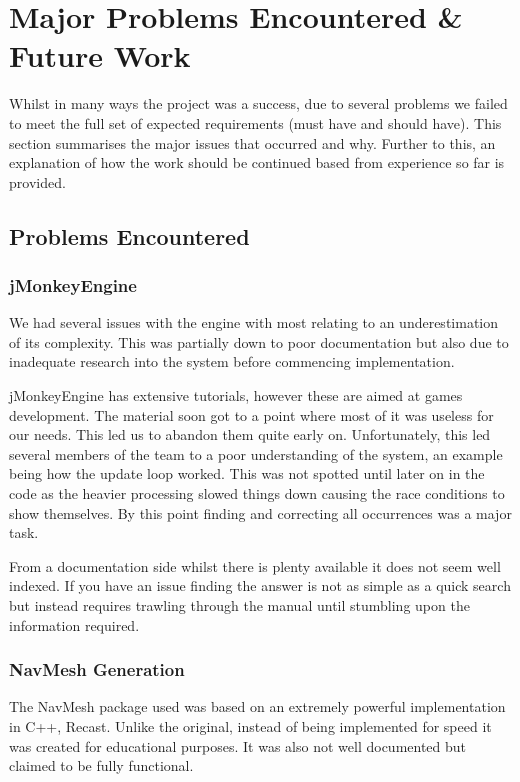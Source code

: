 

\section{Major Problems Encountered \& Future Work}

Whilst in many ways the project was a success, due to several problems
we failed to meet the full set of expected requirements (must have
and should have). This section summarises the major issues that occurred
and why. Further to this, an explanation of how the work should be
continued based from experience so far is provided.


\subsection{Problems Encountered}
\label{Problems:subsec:problemsecountered}

\subsubsection{jMonkeyEngine}

We had several issues with the engine with most relating to an underestimation
of its complexity. This was partially down to poor documentation but
also due to inadequate research into the system before commencing
implementation.

jMonkeyEngine has extensive tutorials, however these are aimed at games
development. The material soon got to a point where most of it was
useless for our needs. This led us to abandon them quite early on.
Unfortunately, this led several members of the team to a poor understanding
of the system, an example being how the update loop worked. This was
not spotted until later on in the code as the heavier processing slowed
things down causing the race conditions to show themselves. By this
point finding and correcting all occurrences was a major task.

From a documentation side whilst there is plenty available it does
not seem well indexed. If you have an issue finding the answer is
not as simple as a quick search but instead requires trawling through
the manual until stumbling upon the information required.


\subsubsection*{NavMesh Generation}
\label{Problems:subsubsec:navmesh}
The NavMesh package used was based on an extremely powerful implementation
in C++, Recast\cite{Recast}. Unlike the original, instead of being implemented for
speed it was created for educational purposes. It was also not well
documented but claimed to be fully functional.

